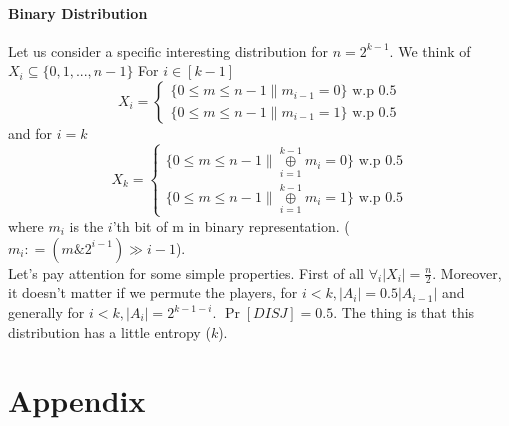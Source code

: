 \documentclass{article}
\begin{document}
\paragraph{Binary Distribution}
Let us consider a specific interesting distribution for $n = 2^{k-1}$. We think of $X_i \subseteq \{0, 1, ... , n-1\} $ \newline
For $i \in [k-1]$
  \[
    X_i=\left\{
                \begin{array}{ll}
                  \{0 \leq m \leq n-1 \| m_{i-1} = 0\} \text{ w.p 0.5} \\
                  \{0 \leq m \leq n-1 \| m_{i-1} = 1\} \text{ w.p 0.5}
                \end{array}
              \right.
  \]
and for $i = k$
  \[
    X_k=\left\{
                \begin{array}{ll}
                  \{0 \leq m \leq n-1 \| \underset{i=1}{\overset{k-1}{\oplus}} m_i = 0\} \text{ w.p 0.5} \\
                  \{0 \leq m \leq n-1 \| \underset{i=1}{\overset{k-1}{\oplus}} m_i = 1\} \text{ w.p 0.5}
                \end{array}
              \right.
  \]
where $m_i$ is the $i$'th bit of m in binary representation. ($m_i \mathrel{\mathop:}= ( m \mathop{\&} 2^{i-1} ) \gg i-1 $). \\
Let's pay attention for some simple properties. First of all $\forall_i |X_i| = \frac{n}{2}$. Moreover, it doesn't matter if we permute the players, for $i < k, |A_i| = 0.5|A_{i-1}|$ and generally for $i < k, |A_i| = 2^{k-1-i}$. $\Pr[DISJ] = 0.5$. The thing is that this distribution has a little entropy ($k$).
\section{Appendix}
\end{document}
